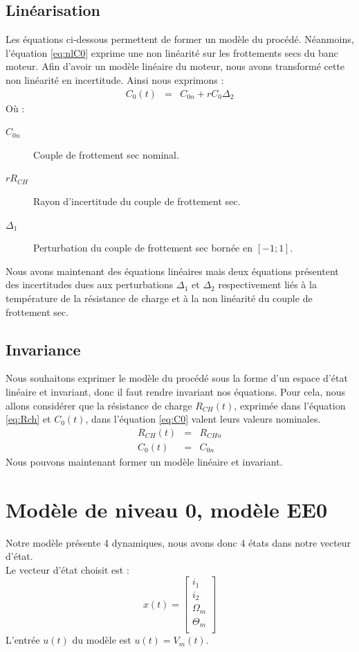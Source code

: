 \subsection{Linéarisation}\label{sub:linearisation}
Les équations ci-dessous permettent de former un modèle du procédé. Néanmoins, l'équation \ref{eq:nlC0} exprime une non linéarité sur les frottements secs du banc moteur. Afin d'avoir un modèle linéaire du moteur, nous avons transformé cette non linéarité en incertitude.
Ainsi nous exprimons : 
\begin{eqnarray}
\label{eq:C0} C_0(t) &=& C_{0n} + rC_0 \Delta_2
\end{eqnarray}
O\`u : 
\begin{description}
\item[$C_{0n}$] Couple de frottement sec nominal.
\item[$rR_{CH}$] Rayon d'incertitude du couple de frottement sec.
\item[$\Delta_1$] Perturbation du couple de frottement sec bornée en $[-1 ; 1]$.
\end{description}
Nous avons maintenant des équations linéaires mais deux équations présentent des incertitudes dues aux perturbations $\Delta_1$ et $ \Delta_2$ respectivement liés à la température de la résistance de charge et à la non linéarité du couple de frottement sec.
\subsection{Invariance}\label{sub:invariance}
Nous souhaitons exprimer le modèle du procédé sous la forme d'un espace d'état linéaire et invariant, donc il faut rendre invariant nos équations. Pour cela, nous allons considérer que la résistance de charge $R_{CH}(t)$, exprimée dans l'équation \ref{eq:Rch} et $C_0(t)$, dans l'équation \ref{eq:C0} valent leurs valeurs nominales. 
\begin{eqnarray}
R_{CH}(t) &=& R_{CHn} \\
C_0(t)    &=& C_{0n}
\end{eqnarray}
Nous pouvons maintenant former un modèle linéaire et invariant.
\section{Modèle de niveau 0, modèle EE0}
Notre modèle présente 4 dynamiques, nous avons donc 4 états dans notre vecteur d'état.\\

Le vecteur d'état choisit est :
\begin{equation}
x(t)=\begin{bmatrix}
i_1\\
i_2\\
\Omega_m\\
\Theta_m\\
\end{bmatrix}
\end{equation} 
L'entrée $u(t)$ du modèle est $u(t)=V_m(t)$.\\

